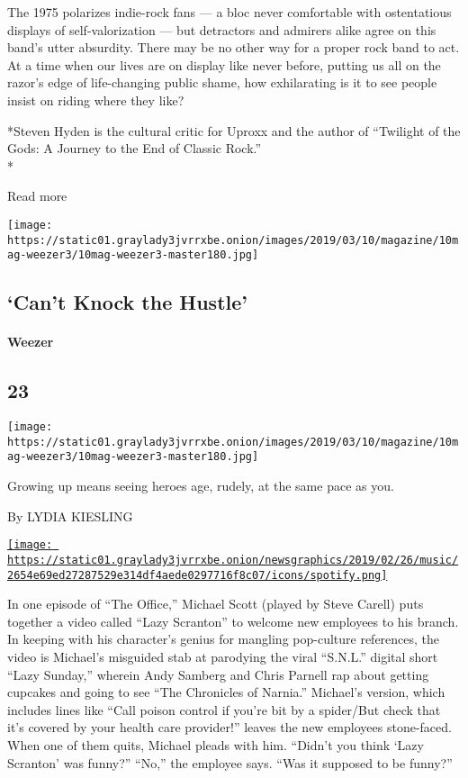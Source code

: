 The 1975 polarizes indie-rock fans --- a bloc never comfortable with
ostentatious displays of self-valorization --- but detractors and
admirers alike agree on this band's utter absurdity. There may be no
other way for a proper rock band to act. At a time when our lives are on
display like never before, putting us all on the razor's edge of
life-changing public shame, how exhilarating is it to see people insist
on riding where they like?

*Steven Hyden is the cultural critic for Uproxx and the author of
``Twilight of the Gods: A Journey to the End of Classic Rock.''\\
*

Read more

\texttt{[image: https://static01.graylady3jvrrxbe.onion/images/2019/03/10/magazine/10mag-weezer3/10mag-weezer3-master180.jpg]}

\hypertarget{--cant-knock-the-hustle}{%
\subsection{\texorpdfstring{ `Can't Knock the
Hustle'}{  `Can't Knock the Hustle'}}\label{--cant-knock-the-hustle}}

\hypertarget{weezer}{%
\paragraph{Weezer}\label{weezer}}

\hypertarget{23}{%
\subsection{23}\label{23}}

\texttt{[image: https://static01.graylady3jvrrxbe.onion/images/2019/03/10/magazine/10mag-weezer3/10mag-weezer3-master180.jpg]}

Growing up means seeing heroes age, rudely, at the same pace as you.

By LYDIA KIESLING

\href{https://open.spotify.com/track/3OSQcSWOOpBUGBPgCMKDdK}{\texttt{[image: https://static01.graylady3jvrrxbe.onion/newsgraphics/2019/02/26/music/2654e69ed27287529e314df4aede0297716f8c07/icons/spotify.png]}}

In one episode of ``The Office,'' Michael Scott (played by Steve Carell)
puts together a video called ``Lazy Scranton'' to welcome new employees
to his branch. In keeping with his character's genius for mangling
pop-culture references, the video is Michael's misguided stab at
parodying the viral ``S.N.L.'' digital short ``Lazy Sunday,'' wherein
Andy Samberg and Chris Parnell rap about getting cupcakes and going to
see ``The Chronicles of Narnia.'' Michael's version, which includes
lines like ``Call poison control if you're bit by a spider/But check
that it's covered by your health care provider!'' leaves the new
employees stone-faced. When one of them quits, Michael pleads with him.
``Didn't you think `Lazy Scranton' was funny?'' ``No,'' the employee
says. ``Was it supposed to be funny?''

